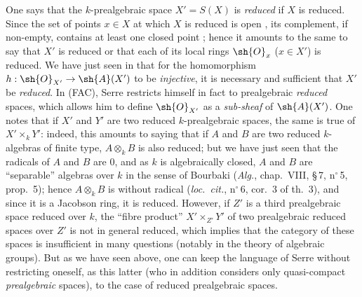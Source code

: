 \begin{env}[10.10.4]
\label{IV.10.10.4}
One says that the $k$-prealgebraic space $X'=S(X)$ is \emph{reduced} if $X$ is reduced. Since the set of points $x\in X$ at which $X$ is reduced is open , its complement, if non-empty, contains at least one closed point ; hence it amounts to the same to say that $X'$ is reduced or that each of its local rings $\sh{O}_x$ ($x\in X'$) is reduced. We have just seen in  that for the homomorphism $h:\sh{O}_{X'}\to\sh{A}(X')$ to be \emph{injective}, it is necessary and sufficient that $X'$ be \emph{reduced}.
In (FAC), Serre restricts himself in fact to prealgebraic \emph{reduced} spaces, which allows him to define $\sh{O}_{X'}$ as a \emph{sub-sheaf} of $\sh{A}(X')$.
One notes that if $X'$ and $Y'$ are two reduced $k$-prealgebraic spaces, the same is true of $X'\times_k Y'$: indeed, this amounts to saying that if $A$ and $B$ are two reduced $k$-algebras of finite type, $A\otimes_k B$ is also reduced; but we have just seen that the radicals of $A$ and $B$ are $0$, and as $k$ is algebraically closed, $A$ and $B$ are ``separable'' algebras over $k$ in the sense of Bourbaki (\emph{Alg.}, chap.~VIII, \S\,7, n$^\circ$\,5, prop.~5); hence $A\otimes_k B$ is without radical (\emph{loc.\ cit.}, n$^\circ$\,6, cor.~3 of th.~3), and since it is a Jacobson ring, it is reduced.
However, if $Z'$ is a third prealgebraic space reduced over $k$, the ``fibre product'' $X'\times_{Z'}Y'$ of two prealgebraic reduced spaces over $Z'$ is not in general reduced, which implies that the category of these spaces is insufficient in many questions (notably in the theory of algebraic groups).
But as we have seen above, one can keep the language of Serre without restricting oneself, as this latter (who in addition considers only quasi-compact \emph{prealgebraic} spaces), to the case of reduced prealgebraic spaces.
\end{env}


